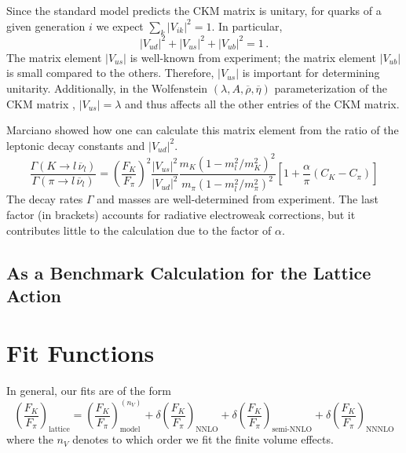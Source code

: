 \documentclass[prd,tightenlines,preprintnumbers,showpacs,superscriptaddress,notitlepage,eqsecnum,floatfix,notitlepage]{revtex4-1}
\begin{document}
Since the standard model predicts the CKM matrix is unitary, for quarks of a given generation $i$ we expect $\sum_k |V_{ik}|^2 = 1$. In particular,
\begin{equation}
|V_{ud}|^2 + |V_{us}|^2 + |V_{ub}|^2 = 1 \, .
\end{equation} 
The matrix element $|V_{us}|$ is well-known from experiment; the matrix element $|V_{ub}|$ is small compared to the others. Therefore, $|V_{us}|$ is important for determining unitarity. Additionally, in the Wolfenstein  $(\lambda, A, \overline{\rho}, \overline{\eta})$ parameterization of the CKM matrix \cite{Wolfenstein:1983yz}, $|V_{us}| = \lambda$ and thus affects all the other entries of the CKM matrix.

Marciano \cite{Marciano:2004uf, Durr:2010hr} showed how one can calculate this matrix element from the ratio of the leptonic decay constants and $|V_{ud}|^2$.
\begin{equation}
\frac{\Gamma(K \rightarrow l \, \overline{\nu}_l)}{\Gamma(\pi \rightarrow l \, \overline{\nu}_l)} =
\left(\frac{F_K}{F_\pi} \right)^2 \frac{|V_{us}|^2}{|V_{ud}|^2} \frac{m_K (1 - m_l^2/ m_K^2)^2}{m_\pi (1 - m_l^2/ m_\pi^2)^2} \left[ 1 + \frac{\alpha}{\pi}(C_K - C_\pi) \right]
\end{equation}
The decay rates $\Gamma$ and masses are well-determined from experiment. The last factor (in brackets) accounts for radiative electroweak corrections, but it contributes little to the calculation due to the factor of $\alpha$.

\subsection{As a Benchmark Calculation for the Lattice Action}


\section{Fit Functions}

In general, our fits are of the form
\begin{equation}
\left(\frac{F_K}{F_\pi}\right)_\text{lattice} = \left(\frac{F_K}{F_\pi}\right)_\text{model}^{(n_V)} +
\delta\left(\frac{F_K}{F_\pi}\right)_\text{NNLO} +
\delta\left(\frac{F_K}{F_\pi}\right)_\text{semi-NNLO} +
\delta\left(\frac{F_K}{F_\pi}\right)_\text{NNNLO}
\end{equation}
where the $n_V$ denotes to which order we fit the finite volume effects.
\end{document}
